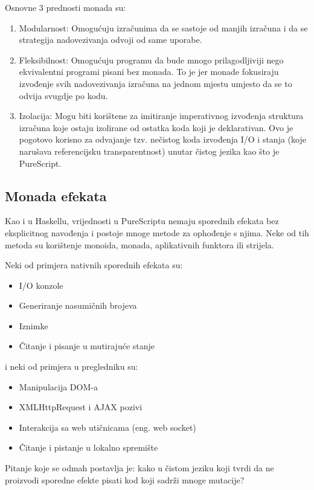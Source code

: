 \documentclass[times, utf8, zavrsni]{fer}
\begin{document}
Osnovne 3 prednosti monada su:
\begin{enumerate}
\item Modularnost: Omogućuju izračunima da se sastoje od manjih izračuna i da se strategija nadovezivanja odvoji od same uporabe.
\item Fleksibilnost: Omogućuju programu da bude mnogo prilagodljiviji nego ekvivalentni programi pisani bez monada. To je jer monade fokusiraju izvođenje svih nadovezivanja izračuna na jednom mjestu umjesto da se to odvija svugdje po kodu.
\item Izolacija: Mogu biti korištene za imitiranje imperativnog izvođenja struktura izračuna koje ostaju izolirane od ostatka koda koji je deklarativan. Ovo je pogotovo korisno za odvajanje tzv. nečistog koda izvođenja I/O i stanja (koje narušava referencijsku transparentnost) unutar čistog jezika kao što je PureScript.
\end{enumerate}

\subsection{Monada efekata}
Kao i u Haskellu, vrijednosti u PureScriptu nemaju sporednih efekata bez eksplicitnog navođenja i postoje mnoge metode za ophođenje s njima. Neke od tih metoda su korištenje monoida, monada, aplikativnih funktora ili strijela.

Neki od primjera nativnih sporednih efekata su:
\begin{itemize}
\item I/O konzole
\item Generiranje nasumičnih brojeva
\item Iznimke
\item Čitanje i pisanje u mutirajuće stanje
\end{itemize}

i neki od primjera u pregledniku su:
\begin{itemize}
\item Manipulacija DOM-a
\item XMLHttpRequest i AJAX pozivi
\item Interakcija sa web utičnicama (eng. web socket)
\item Čitanje i pistanje u lokalno spremište
\end{itemize}

Pitanje koje se odmah postavlja je: kako u čistom jeziku koji tvrdi da ne proizvodi sporedne efekte pisati kod koji sadrži mnoge mutacije?
\end{document}
